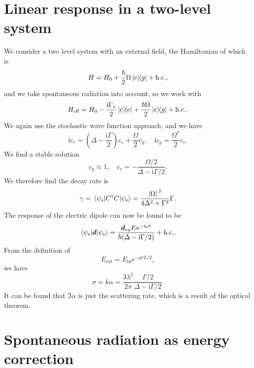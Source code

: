 \documentclass[hyperref, a4paper]{article}
\newcommand*{\ii}{\mathrm{i}}
\newcommand*{\ee}{\mathrm{e}}
\begin{document}
\section{Linear response in a two-level system}

We consider a two level system with an external field, the Hamiltonian of which is  
\begin{equation}
    H = H_0 + \frac{\hbar}{2} \Omega \dyad{e}{g} + \text{h.c.},
\end{equation}
and we take spontaneous radiation into account, so we work with 
\begin{equation}
    H_\text{eff} = H_0 - \frac{\ii \Gamma_e}{2} \dyad{e} + \frac{\hbar \Omega}{2} \dyad{e}{g} + \text{h.c.}.
\end{equation} 
We again use the stochastic wave function approach, and we have 
\begin{equation}
    \ii \dot{c}_e = \left( \Delta - \frac{\ii \Gamma}{2} \right) c_e + \frac{\Omega}{2} c_g, \quad
    \ii \dot{c}_g = \frac{\Omega^*}{2} c_e.
\end{equation}
We find a stable solution 
\begin{equation}
    c_g \approx 1, \quad c_e = - \frac{\Omega / 2}{\Delta - \ii \Gamma / 2}.
\end{equation}
We therefore find the decay rate is  
\begin{equation}
    \gamma = \mel*{\psi_\text{s}}{C^\dagger C}{\psi_\text{s}} = \frac{\abs*{\Omega}^2}{4 \Delta^2 + \Gamma^2} \Gamma.
\end{equation}
The response of the electric dipole can now be found to be 
\begin{equation}
    \expval*{\vb*{d}}{\psi_\text{s}} = \frac{\vb*{d}_{eg} E \ee^{- \ii \omega t}}{\hbar (\Delta - \ii \Gamma /2)} + \text{h.c.}.
\end{equation}
From the definition of 
\begin{equation}
    E_\text{ext} = E_\text{in} \ee^{- \rho \sigma L / 2},
\end{equation}
we have 
\begin{equation}
    \sigma = k \alpha = \frac{3 \lambda^2}{2 \pi} \frac{\Gamma / 2}{\Delta - \ii \Gamma / 2}.
\end{equation}
It can be found that $\Im \alpha$ is just the scattering rate, which is a result of the optical theorem.

\section{Spontaneous radiation as energy correction}
\end{document}
